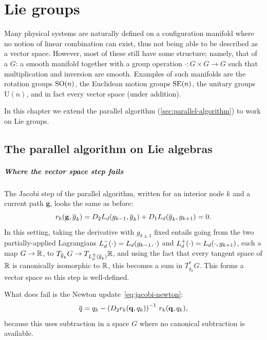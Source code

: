 \chapter{Lie groups}\label{sec:lie-groups}


Many physical systems are naturally defined on a configuration manifold where no notion of linear combination can exist, thus not being able to be described as a vector space. However, most of these still have some structure; namely, that of a  $G$: a smooth manifold together with a group operation $\cdot : G \times G \to G$ such that multiplication and inversion are smooth. Examples of such manifolds are the rotation groups $\mathrm{SO}(n)$, the Euclidean motion groups $\mathrm{SE}(n)$, the unitary groups $\textrm{U}(n)$, and in fact every vector space (under addition).

In this chapter we extend the parallel algorithm (\cref{sec:parallel-algorithm}) to work on Lie groups.

\section{The parallel algorithm on Lie algebras}\label{sec:lie-groups-algorithm}

\paragraph{Where the vector space step fails}\label{sec:lie-vector-space-fails}

The Jacobi step of the parallel algorithm, written for an interior node $k$ and a current path $\mathbf{g}$, looks the same as before:
\[
	r_k(\mathbf{g}, \overline{g}_k) = D_{2} L_d(g_{k-1}, \overline{g}_k) + D_{1} L_d(\overline{g}_k, g_{k+1}) = 0.
\]
In this setting, taking the derivative with $g_{k\pm1}$ fixed entails going from the two partially-applied Lagrangians $L_d^-(\cdot) = L_d(g_{k-1}, \cdot)$ and $L_d^+(\cdot) = L_d(\cdot, g_{k+1})$, each a map $G \to {\mathbb{R}}$, to $T_{\overline{g}_k} G \to T_{L_d^\pm (\overline{g}_k)} {\mathbb{R}}$, and using the fact that every tangent space of ${\mathbb{R}}$ is canonically isomorphic to ${\mathbb{R}}$, this becomes a sum in $T_{\overline{g}_k}^* G$. This forms a vector space so this step is well-defined.

What does fail is the Newton update~\eqref{eq:jacobi-newton}:
\[ \overline{q} = q_k - \left(D_{2} r_k(\mathbf{q}, q_k)\right)^{-1}\, r_k(\mathbf{q}, q_k), \]
because this uses subtraction in a space $G$ where no canonical subtraction is available.

